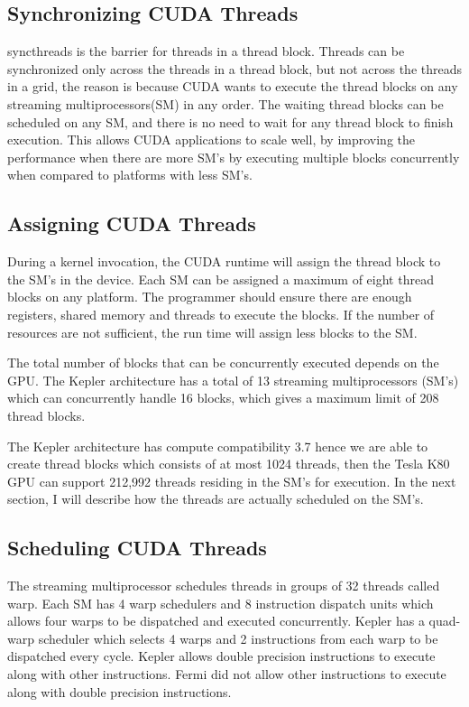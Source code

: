 \subsection{Synchronizing CUDA Threads}
syncthreads is the barrier for threads in a thread block. Threads can be synchronized only across the threads in a thread block, but not across the threads in a grid, the reason is because CUDA wants to execute the thread blocks on any streaming multiprocessors(SM) in any order. 
The waiting thread blocks can be scheduled on any SM, and there is no need to wait for any thread block to finish execution. This allows CUDA applications to scale well, by improving the performance when there are more SM’s by executing multiple blocks concurrently when compared to platforms with less SM’s. 

\subsection{Assigning CUDA Threads}
During a kernel invocation, the CUDA runtime will assign the thread block to the SM’s in the device. Each SM can be assigned a maximum of eight thread blocks on any platform. The programmer should ensure there are enough registers, shared memory and threads to execute the blocks. If the number of resources are not sufficient, the run time will assign less blocks to the SM. 

The total number of blocks that can be concurrently executed depends on the GPU. The Kepler architecture has a total of 13 streaming multiprocessors (SM’s) which can concurrently handle 16 blocks, which gives a maximum limit of 208 thread blocks.

The Kepler architecture has compute compatibility 3.7 hence we are able to create thread blocks which consists of at most 1024 threads, then the Tesla K80 GPU can support 212,992 threads residing in the SM’s for execution. In the next section, I will describe how the threads are actually scheduled on the SM’s.

\subsection{Scheduling CUDA Threads}
The streaming multiprocessor schedules threads in groups of 32 threads called warp.
Each SM has 4 warp schedulers and 8 instruction dispatch units which allows four warps to be dispatched and executed concurrently. Kepler has a quad-warp scheduler which selects 4 warps and  2 instructions from each warp to be dispatched every cycle. Kepler allows double precision instructions to execute along with other instructions. Fermi did not allow other instructions to execute along with double precision instructions.

